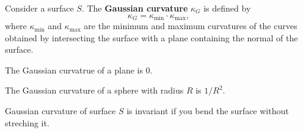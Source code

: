 \begin{definition}
    Consider a surface $S$. The \textbf{Gaussian curvature} $ \kappa_G $ is defined by 
    \[
        \kappa_G=\kappa_{\text{min}}\cdot \kappa_{\text{max}},
    \]
    where $ \kappa_{\text{min}} $ and $ \kappa_{\text{max}} $ are the minimum and maximum curvatures of the curves obtained by intersecting the surface with a plane containing the normal of the surface.
\end{definition}

\begin{example}
    The Gaussian curvatrue of a plane is 0.
\end{example}
\begin{example}
    The Gaussian curvature of a sphere with radius $R$ is $ 1/R^2 $.
\end{example}

\begin{theorem}[Gauss]\label{thm:Gauss}
    Gaussian curvature of surface $S$ is invariant if you bend the surface without streching it.
\end{theorem}